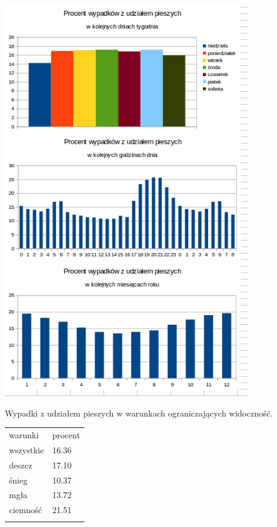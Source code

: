 \includegraphics[width=0.8\textwidth]{images/hipotheses/pedestrians/pedestrians.png}

Wypadki z udziałem pieszych w warunkach ograniczających widoczność.

\begin{longtable}[c]{@{}ll@{}}
\toprule\addlinespace
warunki & procent
\\\addlinespace
\midrule\endhead
wszystkie & 16.36
\\\addlinespace
deszcz & 17.10
\\\addlinespace
śnieg & 10.37
\\\addlinespace
mgła & 13.72
\\\addlinespace
ciemność & 21.51
\\\addlinespace
\bottomrule
\end{longtable}
